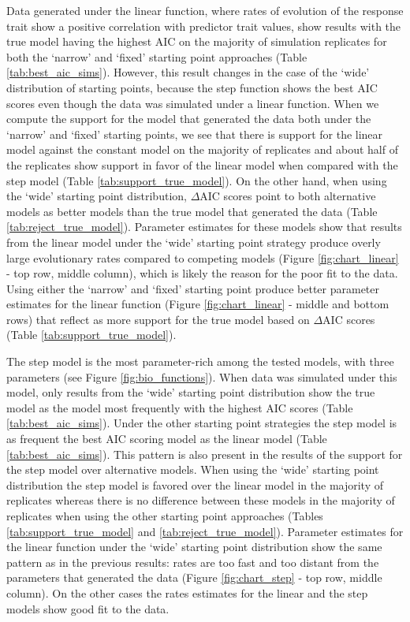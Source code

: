 Data generated under the linear function, where rates of evolution of the response trait show a positive correlation with predictor trait values, show results with the true model having the highest AIC on the majority of simulation replicates for both the `narrow' and `fixed' starting point approaches (Table \ref{tab:best_aic_sims}). However, this result changes in the case of the `wide' distribution of starting points, because the step function shows the best AIC scores even though the data was simulated under a linear function. When we compute the support for the model that generated the data both under the `narrow' and `fixed' starting points, we see that there is support for the linear model against the constant model on the majority of replicates and about half of the replicates show support in favor of the linear model when compared with the step model (Table \ref{tab:support_true_model}). On the other hand, when using the `wide' starting point distribution, $\Delta$AIC scores point to both alternative models as better models than the true model that generated the data (Table \ref{tab:reject_true_model}). Parameter estimates for these models show that results from the linear model under the `wide' starting point strategy produce overly large evolutionary rates compared to competing models (Figure \ref{fig:chart_linear} - top row, middle column), which is likely the reason for the poor fit to the data. Using either the `narrow' and `fixed' starting point produce better parameter estimates for the linear function (Figure \ref{fig:chart_linear} - middle and bottom rows) that reflect as more support for the true model based on $\Delta$AIC scores (Table \ref{tab:support_true_model}).

The step model is the most parameter-rich among the tested models, with three parameters (see Figure \ref{fig:bio_functions}). When data was simulated under this model, only results from the `wide' starting point distribution show the true model as the model most frequently with the highest AIC scores (Table \ref{tab:best_aic_sims}). Under the other starting point strategies the step model is as frequent the best AIC scoring model as the linear model (Table \ref{tab:best_aic_sims}). This pattern is also present in the results of the support for the step model over alternative models. When using the `wide' starting point distribution the step model is favored over the linear model in the majority of replicates whereas there is no difference between these models in the majority of replicates when using the other starting point approaches (Tables \ref{tab:support_true_model} and \ref{tab:reject_true_model}). Parameter estimates for the linear function under the `wide' starting point distribution show the same pattern as in the previous results: rates are too fast and too distant from the parameters that generated the data (Figure \ref{fig:chart_step} - top row, middle column). On the other cases the rates estimates for the linear and the step models show good fit to the data.

